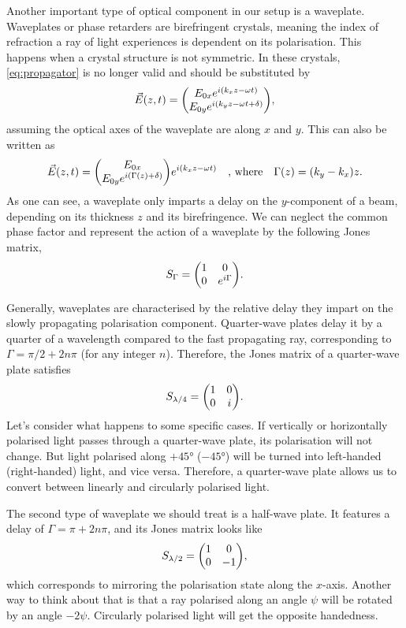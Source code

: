 Another important type of optical component in our setup is a waveplate. Waveplates or phase retarders are birefringent crystals, meaning the index of refraction a ray of light experiences is dependent on its polarisation. This happens when a crystal structure is not symmetric.  In these crystals, \autoref{eq:propagator} is no longer valid and should be substituted by
\begin{equation}
	\vec{E}(z, t) = \mqty(\Eox e^{i(k_x z-\omega t)} \\ \Eoy e^{i(k_y z-\omega t + \delta)} ),
\end{equation}
assuming the optical axes of the waveplate are along $ x $ and $ y $. This can also be written as
\begin{equation}
	\vec{E}(z, t) = \mqty(\Eox  \\ \Eoy e^{i(\Gamma(z) + \delta)} ) e^{i(k_x z-\omega t)}
	\qq{, where}
	\Gamma(z) = (k_y-k_x) z.
\end{equation}
As one can see, a waveplate only imparts a delay on the $ y $-component of a beam, depending on its thickness $ z $ and its birefringence. We can neglect the common phase factor and represent the action of a waveplate by the following Jones matrix, 
\begin{equation}
	S_\Gamma = \mqty(1 & 0 \\ 0 & e^{i\Gamma}).
\end{equation}

Generally, waveplates are characterised by the relative delay they impart on the slowly propagating polarisation component. Quarter-wave plates delay it by a quarter of a wavelength compared to the fast propagating ray, corresponding to $ \Gamma = \pi/2 + 2n\pi $ (for any integer $ n $). Therefore, the Jones matrix of a quarter-wave plate satisfies 
\begin{equation}
	S_\qwp = \mqty(1 & 0 \\ 0 & i).
\end{equation}
Let's consider what happens to some specific cases. If vertically or horizontally polarised light passes through a quarter-wave plate, its polarisation will not change. But light polarised along $ +\ang{45} $ ($ -\ang{45} $) will be turned into left-handed (right-handed) light, and vice versa. Therefore, a quarter-wave plate allows us to convert between linearly and circularly polarised light. 

The second type of waveplate we should treat is a half-wave plate. It features a delay of $ \Gamma = \pi + 2n\pi $, and its Jones matrix looks like
\begin{equation}
	S_\hwp = \mqty(1 & 0 \\ 0 & -1),
\end{equation}
which corresponds to mirroring the polarisation state along the $ x $-axis. Another way to think about that is that a ray polarised along an angle $ \psi $ will be rotated by an angle $ -2\psi $. Circularly polarised light will get the opposite handedness.

